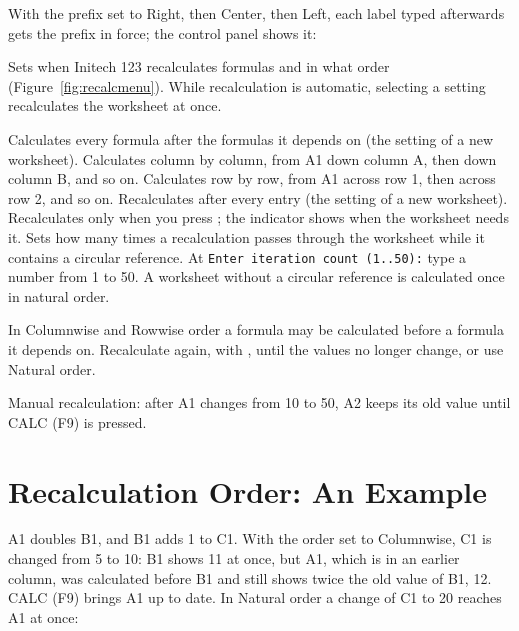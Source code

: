 With the prefix set to Right, then Center, then Left, each label typed
afterwards gets the prefix in force; the control panel shows it:


Sets when Initech 123 recalculates formulas and in what order
(Figure~\ref{fig:recalcmenu}).  While recalculation is automatic, selecting
a setting recalculates the worksheet at once.
\begin{Options}
 Calculates every formula after the formulas it depends
  on (the setting of a new worksheet).
 Calculates column by column, from A1 down column A,
  then down column B, and so on.
 Calculates row by row, from A1 across row 1, then across
  row 2, and so on.
 Recalculates after every entry (the setting of a new
  worksheet).
 Recalculates only when you press ; the
   indicator shows when the worksheet needs it.
 Sets how many times a recalculation passes through the
  worksheet while it contains a circular reference.  At \texttt{Enter
  iteration count (1..50):} type a number from 1 to 50.  A worksheet
  without a circular reference is calculated once in natural order.
\end{Options}

\begin{Note}
In Columnwise and Rowwise order a formula may be calculated before a
formula it depends on.  Recalculate again, with , until the
values no longer change, or use Natural order.
\end{Note}

Manual recalculation: after A1 changes from 10 to 50, A2 keeps its old
value until CALC (F9) is pressed.

\section{Recalculation Order: An Example}
A1 doubles B1, and B1 adds 1 to C1.  With the order set to Columnwise,
C1 is changed from 5 to 10: B1 shows 11 at once, but A1, which is in an
earlier column, was calculated before B1 and still shows twice the old
value of B1, 12.  CALC (F9) brings A1 up to date.  In Natural order a
change of C1 to 20 reaches A1 at once:


